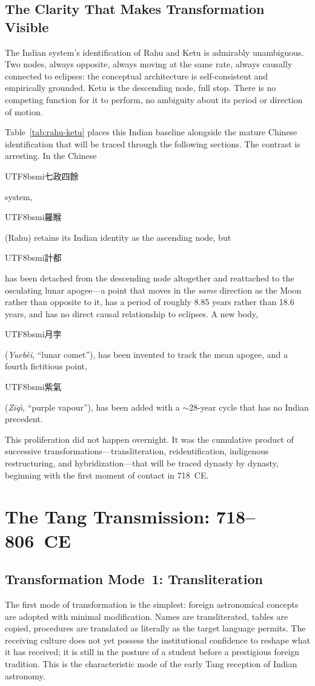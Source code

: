 \documentclass[10pt,a4paper]{article}
\newcommand{\zh}[1]{\begin{CJK}{UTF8}{bsmi}#1\end{CJK}}
\begin{document}
\subsection*{The Clarity That Makes Transformation Visible}

The Indian system's identification of Rahu and Ketu is admirably
unambiguous. Two nodes, always opposite, always moving at the same rate,
always causally connected to eclipses: the conceptual architecture is
self-consistent and empirically grounded.  Ketu is the descending node,
full stop.  There is no competing function for it to perform, no
ambiguity about its period or direction of motion.

Table~\ref{tab:rahu-ketu} places this Indian baseline alongside the
mature Chinese identification that will be traced through the following
sections.  The contrast is arresting.  In the Chinese \zh{七政四餘}
system, \zh{羅睺} (Rahu) retains its Indian identity as the ascending
node, but \zh{計都} has been detached from the descending node
altogether and reattached to the osculating lunar apogee---a point that
moves in the \emph{same} direction as the Moon rather than opposite to
it, has a period of roughly 8.85 years rather than 18.6 years, and has
no direct causal relationship to eclipses.  A new body, \zh{月孛}
(\textit{Yueb\`ei}, ``lunar comet''), has been invented to track the
mean apogee, and a fourth fictitious point, \zh{紫氣} (\textit{Ziq\`{\i}},
``purple vapour''), has been added with a $\sim$28-year cycle that has
no Indian precedent.

This proliferation did not happen overnight.  It was the cumulative
product of successive transformations---transliteration, reidentification,
indigenous restructuring, and hybridization---that will be traced
dynasty by dynasty, beginning with the first moment of contact in
718~CE.

\section{The Tang Transmission: 718--806~CE}\label{sec:tang}

\subsection*{Transformation Mode~1: Transliteration}

The first mode of transformation is the simplest: foreign astronomical
concepts are adopted with minimal modification.  Names are transliterated,
tables are copied, procedures are translated as literally as the target
language permits.  The receiving culture does not yet possess the
institutional confidence to reshape what it has received; it is still
in the posture of a student before a prestigious foreign tradition.
This is the characteristic mode of the early Tang reception of Indian
astronomy.
\end{document}
